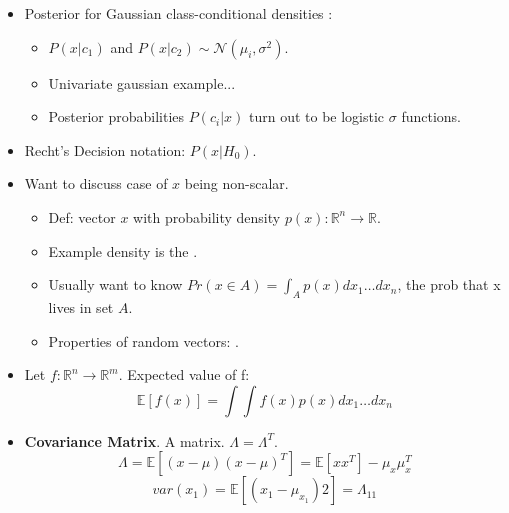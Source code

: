 \documentclass[12pt]{article}
\begin{document}
\begin{itemize}
	\item Posterior for Gaussian class-conditional densities :
	\begin{itemize}
		\item $P(x | c_1)$ and $P(x | c_2) \sim \mathcal{N}(\mu_i, \sigma^2)$.
		\item Univariate gaussian example...
		\item Posterior probabilities $P(c_i | x)$ turn out to be logistic $\sigma$ functions.
	\end{itemize}
\end{itemize}

\begin{itemize}[$\Rightarrow$]
	\item Recht's Decision notation: $P(x | H_0)$. 
	\item Want to discuss case of $x$ being non-scalar. 
	\begin{itemize}
		\item Def: vector $x$ with probability density $p(x): \mathbb{R}^n \rightarrow \mathbb{R}$.
		\item Example density is the .
		\item Usually want to know $Pr(x \in A) = \int_A p(x) dx_1 \ldots dx_n$, the prob that x lives in set $A$.
		\item Properties of random vectors: .
	\end{itemize}

	\item Let $f : \mathbb{R}^n \rightarrow \mathbb{R}^m$. Expected value of f:
	\begin{equation}
	\mathbb{E} [ f(x)  ] = \int \int f(x) p(x) dx_1 \ldots dx_n
	\end{equation}

	\item \textbf{Covariance Matrix}. A matrix. $\Lambda = \Lambda^T$.
	\begin{equation}
	\Lambda = \mathbb{E} [ (x - \mu) (x - \mu)^T] = \mathbb{E} [x x^T] - \mu_x \mu_x^T
	\end{equation}
	\begin{equation}
	var(x_1) = \mathbb{E} [ (x_1 - \mu_{x_1})2 ] = \Lambda_{11}
	\end{equation}


\end{itemize}
\end{document}
